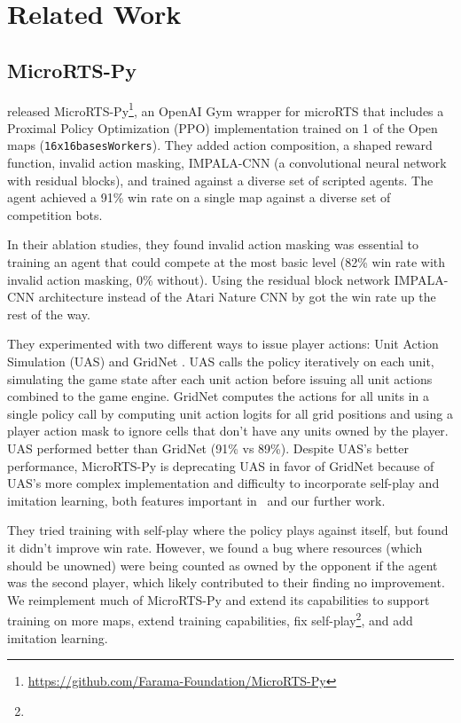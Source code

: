 \documentclass[conference]{IEEEtran}
\begin{document}
\section{Related Work}
\subsection{MicroRTS-Py}
\cite{DBLP:journals/corr/abs-2105-13807} released MicroRTS-Py\footnote{\url{https://github.com/Farama-Foundation/MicroRTS-Py}}, an OpenAI Gym
wrapper for microRTS that includes a Proximal Policy Optimization (PPO) \cite{DBLP:journals/corr/SchulmanWDRK17} implementation
trained on 1 of the Open maps (\texttt{16x16basesWorkers}). They added action composition, a shaped reward function, invalid action
masking, IMPALA-CNN (a convolutional neural network with residual blocks), and trained
against a diverse set of scripted agents. The agent achieved a
91\% win rate on a single map against a diverse set of competition bots.

In their ablation studies, they found invalid action masking was essential to training an agent that could compete at
the most basic level (82\% win rate with invalid action masking, 0\% without). Using the
residual block network IMPALA-CNN architecture instead of the Atari Nature CNN by
\cite{DBLP:journals/corr/MnihKSGAWR13} got the win rate up the rest of the way.

They experimented with two different ways to issue player actions: Unit Action Simulation (UAS)
and GridNet \cite{DBLP:conf/icml/HanSDXWSLZ19}. UAS calls the policy iteratively on each unit, simulating the game state
after each unit action before issuing all unit actions combined to the game engine. GridNet
computes the actions for all units in a single policy call by computing unit action
logits for all grid positions and using a player action mask to ignore cells that don't
have any units owned by the player. UAS performed better than GridNet (91\% vs 89\%).
Despite UAS's better performance, MicroRTS-Py is deprecating UAS in favor of GridNet
because of UAS's more complex implementation and difficulty to incorporate self-play and
imitation learning, both features important in \agentName\ and our further work.

They tried training with self-play where the policy plays against itself, but found it
didn't improve win rate. However, we found a bug where resources
(which should be unowned) were being counted as owned by the opponent if the agent was
the second player, which likely contributed to their finding no improvement. We reimplement much of MicroRTS-Py and extend its capabilities to support training on
more maps, extend training capabilities, fix
self-play\footnote{\unownedFixGitHubCommit}, and add imitation learning.
\end{document}
